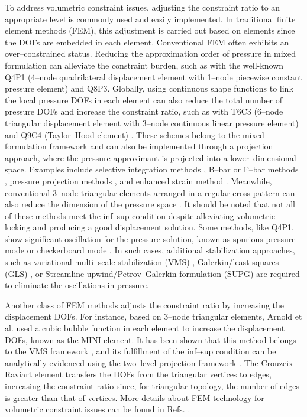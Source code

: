 To address volumetric constraint issues, adjusting the constraint ratio to an appropriate level is commonly used and easily implemented.
In traditional finite element methods (FEM), this adjustment is carried out based on elements since the DOFs are embedded in each element.
Conventional FEM often exhibits an over--constrained status.
Reducing the approximation order of pressure in mixed formulation can alleviate the constraint burden, such as with the well-known Q4P1 (4--node quadrilateral displacement element with 1--node piecewise constant pressure element) and Q8P3.
Globally, using continuous shape functions to link the local pressure DOFs in each element can also reduce the total number of pressure DOFs and increase the constraint ratio, such as with T6C3 (6--node triangular displacement element with 3--node continuous linear pressure element) and Q9C4 (Taylor--Hood element) \cite{hood1974}.
These schemes belong to the mixed formulation framework and can also be implemented through a projection approach, where the pressure approximant is projected into a lower--dimensional space.
Examples include selective integration methods \cite{malkus1978,shilt2020}, B--bar or F--bar methods \cite{simo1990,broccardo2009,coombs2018,saloustros2021}, pressure projection methods \cite{simo1985,dohrmann2004,valverde-gonzalez2023,xu2023,liguori2024}, and enhanced strain method \cite{alvesdesousa2003}.
Meanwhile, conventional 3--node triangular elements arranged in a regular cross pattern can also reduce the dimension of the pressure space \cite{bathe2001}.
It should be noted that not all of these methods meet the inf--sup condition despite alleviating volumetric locking and producing a good displacement solution.
Some methods, like Q4P1, show significant oscillation for the pressure solution, known as spurious pressure mode or checkerboard mode \cite{bathe2001}.
In such cases, additional stabilization approaches, such as variational multi--scale stabilization (VMS) \cite{hughes1995,rossi2021,karabelas2022,codina2024,moreno2025}, Galerkin/least-squares (GLS) \cite{hughes1986}, or Streamline upwind/Petrov--Galerkin formulation (SUPG) \cite{brooks1982, he2025} are required to eliminate the oscillations in pressure.

Another class of FEM methods adjusts the constraint ratio by increasing the displacement DOFs.
For instance, based on 3--node triangular elements, Arnold et al. \cite{arnold1984,auricchio2005} used a cubic bubble function in each element to increase the displacement DOFs, known as the MINI element.
It has been shown that this method belongs to the VMS framework \cite{quarteroni1994}, and its fulfillment of the inf--sup condition can be analytically evidenced using the two--level projection framework \cite{brezzi}.
The Crouzeix--Raviart element \cite{crouzeix1973} transfers the DOFs from the triangular vertices to edges, increasing the constraint ratio since, for triangular topology, the number of edges is greater than that of vertices.
More details about FEM technology for volumetric constraint issues can be found in Refs. \cite{hughes2000,bathe1996,brink1996}.

